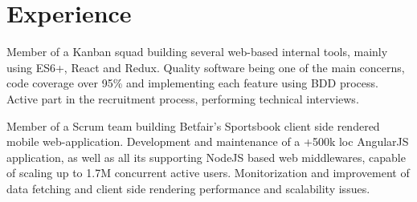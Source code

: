 \documentclass[]{andre-vechina-resume}
\begin{document}
\lastupdated




\section{Experience}

\vspace{\topsep} %
\begin{tightemize}
\item Member of a Kanban squad building several web-based internal tools, mainly using ES6+, React and Redux. Quality software being one of the main concerns, code coverage over 95\% and implementing each feature using BDD process. Active part in the recruitment process, performing technical interviews.
\item Member of a Scrum team building Betfair's Sportsbook client side rendered mobile web-application. Development and maintenance of a +500k loc AngularJS application, as well as all its supporting NodeJS based web middlewares, capable of scaling up to 1.7M concurrent active users. Monitorization and improvement of data fetching and client side rendering performance and scalability issues.
\end{tightemize}
\vspace{\topsep} %
\sectionsep
\end{document}
